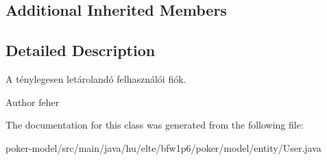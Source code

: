 \subsection*{Additional Inherited Members}


\subsection{Detailed Description}
A ténylegesen letárolandó felhasználói fiók. \begin{DoxyAuthor}{Author}
feher 
\end{DoxyAuthor}


The documentation for this class was generated from the following file\+:\begin{DoxyCompactItemize}
\item 
poker-\/model/src/main/java/hu/elte/bfw1p6/poker/model/entity/User.\+java\end{DoxyCompactItemize}
